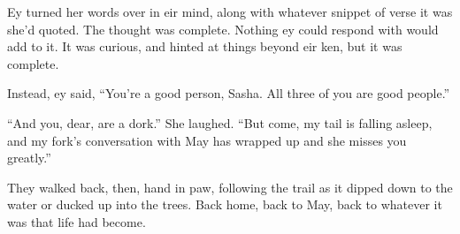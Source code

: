 Ey turned her words over in eir mind, along with whatever snippet of verse it was she'd quoted. The thought was complete. Nothing ey could respond with would add to it. It was curious, and hinted at things beyond eir ken, but it was complete.

Instead, ey said, ``You're a good person, Sasha. All three of you are good people.''

``And you, dear, are a dork.'' She laughed. ``But come, my tail is falling asleep, and my fork's conversation with May has wrapped up and she misses you greatly.''

They walked back, then, hand in paw, following the trail as it dipped down to the water or ducked up into the trees. Back home, back to May, back to whatever it was that life had become.
